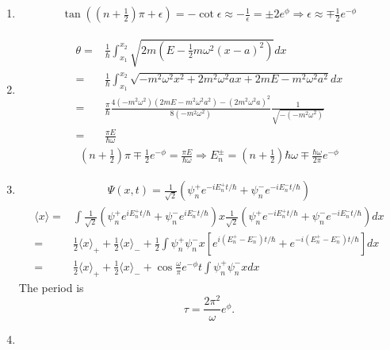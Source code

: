 \begin{enumerate}
    \item 
    \begin{align*}
        \tan((n+\frac{1}{2})\pi+\epsilon)
        =-\cot \epsilon\approx -\frac{1}{\epsilon}
        =\pm 2e^\phi
        \Rightarrow
        \epsilon\approx \mp \frac{1}{2}e^{-\phi}
    \end{align*}
    \item 
    \begin{align*}
        \theta =&\frac{1}{\hbar}
        \int_{x_1}^{x_2}\sqrt{2m(E-\frac{1}{2}m\omega^2(x-a)^2)}dx\\
        =&
        \frac{1}{\hbar}
        \int_{x_1}^{x_2}\sqrt{-m^2\omega^2x^2+2m^2\omega^2ax+2mE-m^2\omega^2a^2}dx\\
        =&
        \frac{\pi}{\hbar}
        \frac{4(-m^2\omega^2)(2mE-m^2\omega^2a^2)-(2m^2\omega^2a)^2}{8(-m^2\omega^2)}
        \frac{1}{\sqrt{-(-m^2\omega^2)}}\\
        =&
        \frac{\pi E}{\hbar\omega}
    \end{align*}
    \begin{align*}
        (n+\frac{1}{2})\pi\mp \frac{1}{2}e^{-\phi}=\frac{\pi E}{\hbar\omega}
        \Rightarrow
        E_n^{\pm}=(n+\frac{1}{2})\hbar\omega \mp \frac{\hbar\omega}{2\pi}e^{-\phi}
    \end{align*}
    \item 
    \begin{align*}
        \Psi(x,t)=\frac{1}{\sqrt{2}}(\psi_n^+e^{-iE_n^+t/\hbar}
        +\psi_n^-e^{-iE_n^-t/\hbar})
    \end{align*}
    \begin{align*}
        \langle x\rangle
        =&
        \int 
        \frac{1}{\sqrt{2}}(\psi_n^+e^{iE_n^+t/\hbar}
        +\psi_n^-e^{iE_n^-t/\hbar})x
        \frac{1}{\sqrt{2}}(\psi_n^+e^{-iE_n^+t/\hbar}
        +\psi_n^-e^{-iE_n^-t/\hbar})dx\\
        =&
        \frac{1}{2}\langle x\rangle_+
        +\frac{1}{2}\langle x\rangle_-
        +
        \frac{1}{2}
        \int\psi_n^+\psi_n^-x[e^{i(E_n^+-E_n^-)t/\hbar}
        +e^{-i(E_n^+-E_n^-)t/\hbar}]dx\\
        =&
        \frac{1}{2}\langle x\rangle_+
        +\frac{1}{2}\langle x\rangle_-
        +
        \cos\frac{\omega}{\pi}e^{-\phi}t
        \int\psi_n^+\psi_n^-xdx
    \end{align*}
    The period is 
    $$
    \tau = \frac{2\pi^2}{\omega}e^{\phi}.
    $$
    \item 
    \begin{align*}

\end{align*}
\end{enumerate}
